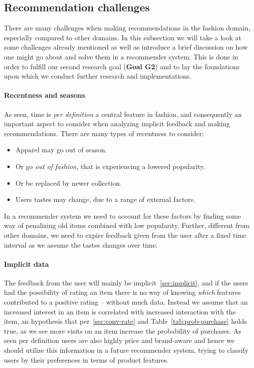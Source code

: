 \subsection{Recommendation challenges}
\label{subsec:rec-challenges}

There are many challenges when making recommendations in the fashion domain,
especially compared to other domains. In this subsection we will take a look at
some challenges already mentioned as well as introduce a brief discussion on
how one might go about and solve them in a recommender system.  This is done in
order to fulfill our second research goal (\textbf{Goal G2}) and to lay the
foundations upon which we conduct further research and implementations.

\paragraph{Recentness and seasons}
As seen, time is \textit{per definition} a central feature in fashion, and
consequently an important aspect to consider when analyzing implicit feedback
and making recommendations. There are many types of recentness to consider:

\begin{itemize}
\item Apparel may go out of season.
\item Or go \textit{out of fashion}, that is experiencing a lowered popularity.
\item Or be replaced by newer collection.
\item Users tastes may change, due to a range of external factors.
\end{itemize}

In a recommender system we need to account for these factors by finding some
way of penalizing old items combined with low popularity. Further, different
from other domains, we need to expire feedback given from the user after a
fixed time interval as we assume the tastes changes over time.

\paragraph{Implicit data}
The feedback from the user will mainly be implicit~\ref{sec:implicit}, and if
the users had the possibility of rating an item there is no way of knowing
\textit{which} features contributed to a positive rating -- without much data.
Instead we assume that an increased interest in an item is correlated with
increased interaction with the item, an hypothesis that per~\ref{sec:conv-rate}
and Table~\ref{tab:prob-purchase} holds true, as we see more visits on an item
increase the probability of purchases. As seen per definition users are also
highly price and brand-aware and hence we should utilize this information in a
future recommender system, trying to classify users by their preferences in
terms of product features.


